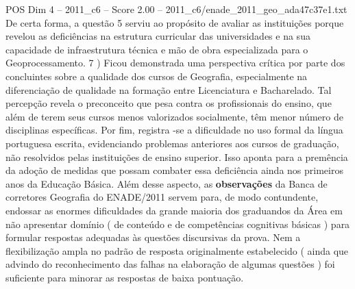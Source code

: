 \begin{textsample}{POS Dim 4 – 2011\_c6 – Score 2.00 – 2011\_c6/enade\_2011\_geo\_ada47c37e1.txt}
De certa forma, a questão 5 serviu ao propósito de avaliar as instituições porque revelou as deficiências na estrutura curricular das universidades e na sua capacidade de infraestrutura técnica e mão de obra especializada para o Geoprocessamento. 7 ) Ficou demonstrada uma perspectiva crítica por parte dos concluintes sobre a qualidade dos cursos de Geografia, especialmente na diferenciação de qualidade na formação entre Licenciatura e Bacharelado.
Tal percepção revela o preconceito que pesa contra os profissionais do ensino, que além de terem seus cursos menos valorizados socialmente, têm menor número de disciplinas específicas.
Por fim, registra -se a dificuldade no uso formal da língua portuguesa escrita, evidenciando problemas anteriores aos cursos de graduação, não resolvidos pelas instituições de ensino superior.
Isso aponta para a premência da adoção de medidas que possam combater essa deficiência ainda nos primeiros anos da Educação Básica.
Além desse aspecto, as \textbf{observações} da Banca de corretores Geografia do ENADE/2011 servem para, de modo contundente, endossar as enormes dificuldades da grande maioria dos graduandos da Área em não apresentar domínio ( de conteúdo e de competências cognitivas básicas ) para formular respostas adequadas às questões discursivas da prova.
Nem a flexibilização ampla no padrão de resposta originalmente estabelecido ( ainda que advindo do reconhecimento das falhas na elaboração de algumas questões ) foi suficiente para minorar as respostas de baixa pontuação.

\end{textsample}
